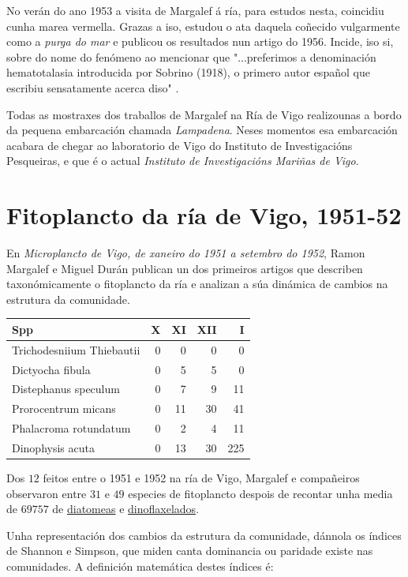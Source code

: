 \documentclass{article}
\begin{document}
No verán do ano 1953 a visita de Margalef á ría, para estudos nesta, coincidiu cunha marea vermella. Grazas a iso, estudou o ata daquela coñecido vulgarmente como a \textit{purga do mar} e publicou os resultados nun artigo do 1956. Incide, iso si, sobre do nome do fenómeno ao mencionar que "...preferimos a denominación hematotalasia introducida por Sobrino (1918), o primero autor español que escribiu sensatamente acerca diso" \cite{margalef1956}.

Todas as mostraxes dos traballos de Margalef na Ría de Vigo realizounas a bordo da pequena embarcación chamada \textit{Lampadena}. Neses momentos esa embarcación acabara de chegar ao laboratorio de Vigo do Instituto de Investigacións Pesqueiras, e que é o actual \textit{Instituto de Investigacións Mariñas de Vigo}.


\section{Fitoplancto da ría de Vigo, 1951-52}

En \textit{Microplancto de Vigo, de xaneiro do 1951 a setembro do 1952}, Ramon Margalef e Miguel Durán publican un dos primeiros artigos que describen taxonómicamente o fitoplancto da ría e analizan a súa dinámica de cambios na estrutura da comunidade. 

\begin{tabular}{lrrrr}
  \hline
Spp & X & XI & XII & I \\ 
  \hline
Trichodesniium Thiebautii & 0 & 0 & 0 & 0 \\ 
  Dictyocha fibula & 0 & 5 & 5 & 0 \\ 
  Distephanus speculum & 0 & 7 & 9 & 11 \\ 
  Prorocentrum micans & 0 & 11 & 30 & 41 \\ 
  Phalacroma  rotundatum & 0 & 2 & 4 & 11 \\ 
  Dinophysis acuta & 0 & 13 & 30 & 225 \\ 
   \hline
\end{tabular}


Dos $12$ feitos entre o 1951 e 1952 na ría de Vigo, Margalef e compañeiros observaron entre $31$ e $49$ especies de fitoplancto despois de recontar unha media de $69757$ de \href{https://gl.wikipedia.org/wiki/Diatomeas}{diatomeas} e \href{https://gl.wikipedia.org/wiki/Dinoflaxelados}{dinoflaxelados}.
 
Unha representación dos cambios da estrutura da comunidade, dánnola os índices de Shannon e Simpson, que miden canta dominancia ou paridade existe nas comunidades. A definición matemática destes índices é:
\end{document}
